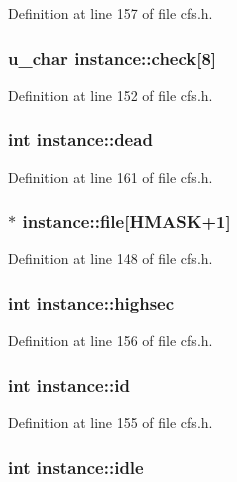 Definition at line 157 of file cfs.h.
\subsubsection{\setlength{\rightskip}{0pt plus 5cm}u\_\-char {\bf instance::check}[8]}\label{structinstance_o4}




Definition at line 152 of file cfs.h.
\subsubsection{\setlength{\rightskip}{0pt plus 5cm}int {\bf instance::dead}}\label{structinstance_o12}




Definition at line 161 of file cfs.h.
\subsubsection{$\ast$ {\bf instance::file}[HMASK+1]}\label{structinstance_o0}




Definition at line 148 of file cfs.h.
\subsubsection{\setlength{\rightskip}{0pt plus 5cm}int {\bf instance::highsec}}\label{structinstance_o7}




Definition at line 156 of file cfs.h.
\subsubsection{\setlength{\rightskip}{0pt plus 5cm}int {\bf instance::id}}\label{structinstance_o6}




Definition at line 155 of file cfs.h.
\subsubsection{\setlength{\rightskip}{0pt plus 5cm}int {\bf instance::idle}}\label{structinstance_o10}




